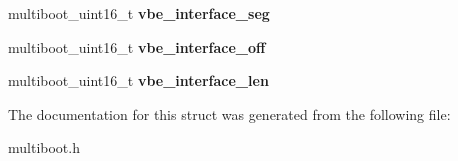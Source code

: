 \begin{DoxyCompactItemize}
multiboot\+\_\+uint16\+\_\+t {\bfseries vbe\+\_\+interface\+\_\+seg}
\item 
\mbox{\label{structmultiboot__info_a1621d51b1cc198a1496e9f61b3708291}} 
multiboot\+\_\+uint16\+\_\+t {\bfseries vbe\+\_\+interface\+\_\+off}
\item 
\mbox{\label{structmultiboot__info_ab3c537df524db1ed0aeaa2e6f61a23e6}} 
multiboot\+\_\+uint16\+\_\+t {\bfseries vbe\+\_\+interface\+\_\+len}
\end{DoxyCompactItemize}


The documentation for this struct was generated from the following file\+:\begin{DoxyCompactItemize}
\item 
multiboot.\+h\end{DoxyCompactItemize}
